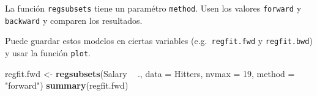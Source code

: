 \documentclass[
  12pt,
]{book}
\newenvironment{Shaded}{\begin{snugshade}}{\end{snugshade}}
\newcommand{\DataTypeTok}[1]{\textcolor[rgb]{0.13,0.29,0.53}{#1}}
\newcommand{\DecValTok}[1]{\textcolor[rgb]{0.00,0.00,0.81}{#1}}
\newcommand{\KeywordTok}[1]{\textcolor[rgb]{0.13,0.29,0.53}{\textbf{#1}}}
\newcommand{\NormalTok}[1]{#1}
\newcommand{\OperatorTok}[1]{\textcolor[rgb]{0.81,0.36,0.00}{\textbf{#1}}}
\newcommand{\StringTok}[1]{\textcolor[rgb]{0.31,0.60,0.02}{#1}}
\theoremstyle{definition}
\theoremstyle{definition}
\theoremstyle{definition}
\theoremstyle{remark}
\begin{document}
La función \texttt{regsubsets} tiene un paramétro \texttt{method}. Usen los valores \texttt{forward} y \texttt{backward} y comparen los resultados.

Puede guardar estos modelos en ciertas variables (e.g.~\texttt{regfit.fwd} y \texttt{regfit.bwd}) y usar la función \texttt{plot}.

\begin{Shaded}
\begin{Highlighting}[]
\NormalTok{regfit.fwd <-}\StringTok{ }\KeywordTok{regsubsets}\NormalTok{(Salary }\OperatorTok{~}\StringTok{ }\NormalTok{., }\DataTypeTok{data =}\NormalTok{ Hitters, }
    \DataTypeTok{nvmax =} \DecValTok{19}\NormalTok{, }\DataTypeTok{method =} \StringTok{"forward"}\NormalTok{)}
\KeywordTok{summary}\NormalTok{(regfit.fwd)}
\end{Highlighting}
\end{Shaded}
\end{document}
